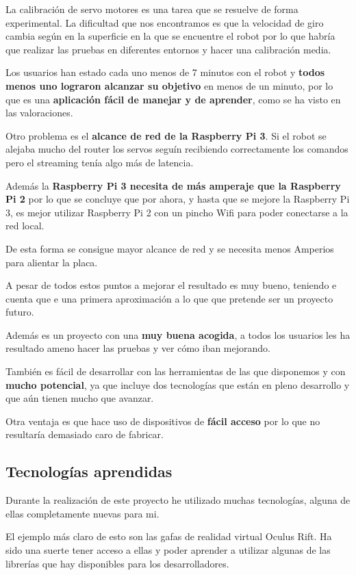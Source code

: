 \documentclass[twoside, 12pt]{epstfg}
\begin{document}
La calibración de servo motores es una tarea que se resuelve de forma experimental. La dificultad que nos encontramos es que la velocidad de giro cambia según en la superficie en la que se encuentre el robot por lo que habría que realizar las pruebas en diferentes entornos y hacer una calibración media.

Los usuarios han estado cada uno menos de 7 minutos con el robot y \textbf{todos menos uno lograron alcanzar su objetivo} en menos de un minuto, por lo que es una \textbf{aplicación fácil de manejar y de aprender}, como se ha visto en las valoraciones.

Otro problema es el \textbf{alcance de red de la Raspberry Pi 3}. Si el robot se alejaba mucho del router los servos seguín recibiendo correctamente los comandos pero el streaming tenía algo más de latencia.

Además la \textbf{Raspberry Pi 3 necesita de más amperaje que la Raspberry Pi 2} por lo que se concluye que por ahora, y hasta que se mejore la Raspberry Pi 3, es mejor utilizar Raspberry Pi 2 con un pincho Wifi para poder conectarse a la red local.

De esta forma se consigue mayor alcance de red y se necesita menos Amperios para alientar la placa.

A pesar de todos estos puntos a mejorar el resultado es muy bueno, teniendo e cuenta que e una primera aproximación a lo que que pretende ser un proyecto futuro.

Además es un proyecto con una \textbf{muy buena acogida}, a todos los usuarios les ha resultado ameno hacer las pruebas y ver cómo iban mejorando.

También es fácil de desarrollar con las herramientas de las que disponemos y con \textbf{mucho potencial}, ya que incluye dos tecnologías que están en pleno desarrollo y que aún tienen mucho que avanzar.

Otra ventaja es que hace uso de dispositivos de \textbf{fácil acceso} por lo que no resultaría demasiado caro de fabricar.

\subsection{Tecnologías aprendidas}

Durante la realización de este proyecto he utilizado muchas tecnologías, alguna de ellas completamente nuevas para mi.

El ejemplo más claro de esto son las gafas de realidad virtual Oculus Rift. Ha sido una suerte tener acceso a ellas y poder aprender a utilizar algunas de las librerías que hay disponibles para los desarrolladores.
\end{document}
